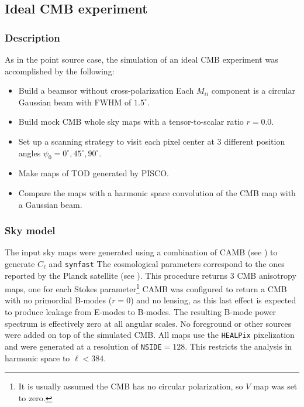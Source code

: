 \documentclass[a4paper,11pt]{article}
\begin{document}
\subsection{Ideal CMB experiment}
\label{sec::ideal_full_sky}

\subsubsection{Description}

As in the point source case, the simulation of an ideal CMB experiment was accomplished by the following:

\begin{itemize}
	\item Build a beamsor without cross-polarization Each $M_{ii}$ component is a circular Gaussian beam with FWHM of $1.5^\circ$.
	\item Build mock CMB whole sky maps with a tensor-to-scalar ratio $r=0.0$.
	\item Set up a scanning strategy to visit each pixel center at 3 different position angles $\psi_0 = 0^{\circ},45^{\circ},90^{\circ}$. 
	\item Make maps of TOD generated by PISCO. 
	\item Compare the maps with a harmonic space convolution of the CMB map with a Gaussian beam.
\end{itemize}

\subsubsection{Sky model}

The input sky maps were generated using a combination of CAMB (see \cite{Lewis:2002ah}) to generate $C_\ell$ and \texttt{synfast} The cosmological parameters correspond to the ones reported by the Planck satellite (see \cite{2016A&A...594A..13P}). This procedure returns 3 CMB anisotropy maps, one for each Stokes parameter\footnote{It is usually assumed the CMB has no circular polarization, so $V$ map was set to zero.} CAMB was configured to return a CMB with no primordial B-modes ($r=0$) and no lensing, as this last effect is expected to produce leakage from E-modes to B-modes. The resulting B-mode power spectrum is effectively zero at all angular scales. No foreground or other sources were added on top of the simulated CMB. All maps use the \texttt{HEALPix} pixelization and were generated at a resolution of \texttt{NSIDE}$=128$. This restricts the analysis in harmonic space to $\ell < 384$.
\end{document}
